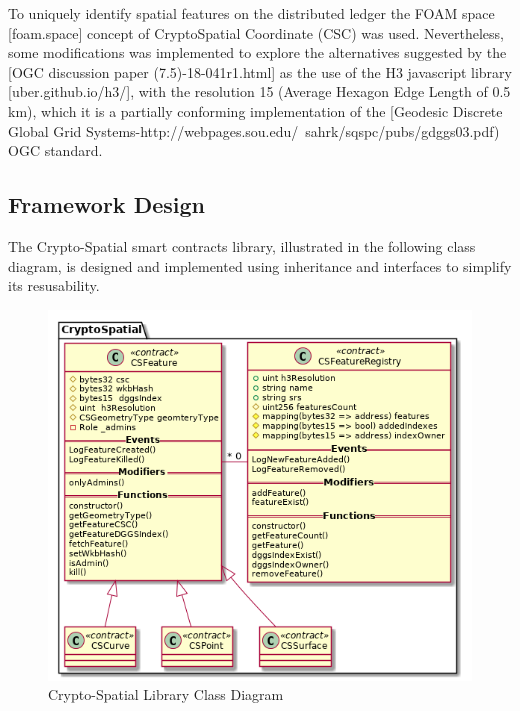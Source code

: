 \documentclass{isprs} %
\begin{document}
To uniquely identify spatial features on the distributed ledger the FOAM space [foam.space] concept of CryptoSpatial Coordinate (CSC) was used. Nevertheless, some modifications was implemented to explore the alternatives suggested by the [OGC discussion paper (7.5)-18-041r1.html] as the use of the H3 javascript library [uber.github.io/h3/], with the resolution 15 (Average Hexagon Edge Length  of 0.5 km), which it is a partially conforming implementation of the [Geodesic Discrete Global Grid Systems-http://webpages.sou.edu/~sahrk/sqspc/pubs/gdggs03.pdf) OGC standard.

\subsection{Framework Design}\label{sec:Framework Design}

The Crypto-Spatial smart contracts library, illustrated in the following class diagram, is designed and implemented using inheritance and interfaces to simplify its resusability.

\begin{figure}[ht!]
\begin{center}
		\includegraphics[width=1.0\columnwidth]{figures/class-crypto-spatial-lib.png}
	\caption{Crypto-Spatial Library Class Diagram}
\label{fig:figure_placement}
\end{center}
\end{figure}
\end{document}
